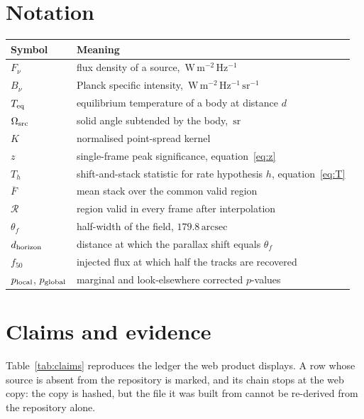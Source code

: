 \documentclass[11pt,a4paper]{article}
\newcommand{\unit}[1]{\,\mathrm{#1}}
\newcommand{\arcsec}{\unit{arcsec}}
\begin{document}
\section{Notation}
\begin{center}
\small
\begin{tabular}{ll}
\toprule
Symbol & Meaning \\
\midrule
$F_\nu$ & flux density of a source, $\unit{W\,m^{-2}\,Hz^{-1}}$ \\
$B_\nu$ & Planck specific intensity, $\unit{W\,m^{-2}\,Hz^{-1}\,sr^{-1}}$ \\
$T_{\rm eq}$ & equilibrium temperature of a body at distance $d$ \\
$\Omega_{\rm src}$ & solid angle subtended by the body, $\unit{sr}$ \\
$K$ & normalised point-spread kernel \\
$z$ & single-frame peak significance, equation~\eqref{eq:z} \\
$T_h$ & shift-and-stack statistic for rate hypothesis $h$, equation~\eqref{eq:T} \\
$\overline{F}$ & mean stack over the common valid region \\
$\mathcal{R}$ & region valid in every frame after interpolation \\
$\theta_f$ & half-width of the field, $179.8\arcsec$ \\
$d_{\rm horizon}$ & distance at which the parallax shift equals $\theta_f$ \\
$f_{50}$ & injected flux at which half the tracks are recovered \\
$p_{\rm local}$, $p_{\rm global}$ & marginal and look-elsewhere corrected $p$-values \\
\bottomrule
\end{tabular}
\end{center}

\section{Claims and evidence}\label{app:claims}
Table~\ref{tab:claims} reproduces the ledger the web product displays. A row whose
source is absent from the repository is marked, and its chain stops at the web
copy: the copy is hashed, but the file it was built from cannot be re-derived from
the repository alone.
\end{document}
